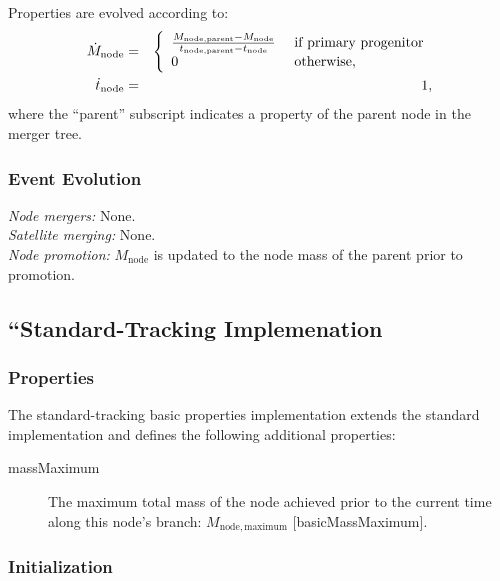 Properties are evolved according to:
\begin{eqnarray}
 \dot{M}_\mathrm{node} &=& \left\{\begin{array}{ll}{M_\mathrm{node, parent} - M_\mathrm{node} \over t_\mathrm{node, parent} - t_\mathrm{node}} & \hbox{ if primary progenitor} \\ 0 & \hbox{ otherwise}, \end{array} \right. \\
 \dot{t}_\mathrm{node} &=& 1,
\end{eqnarray}
where the ``parent'' subscript indicates a property of the parent \gls{node} in the merger tree.

\subsubsection{Event Evolution}

\noindent\emph{Node mergers:} None.\\

\noindent\emph{Satellite merging:} None.\\

\noindent\emph{Node promotion:} $M_\mathrm{node}$ is updated to the \gls{node} mass of the parent prior to promotion.\\

\subsection{``Standard-Tracking Implemenation}

\subsubsection{Properties}

The standard-tracking basic properties implementation extends the standard implementation and defines the following additional properties:
\begin{description}
 \item [{\normalfont \ttfamily massMaximum}] The maximum total mass of the node achieved prior to the current time along this node's branch: $M_\mathrm{node, maximum}$ [{\normalfont \ttfamily basicMassMaximum}].
\end{description}

\subsubsection{Initialization}

